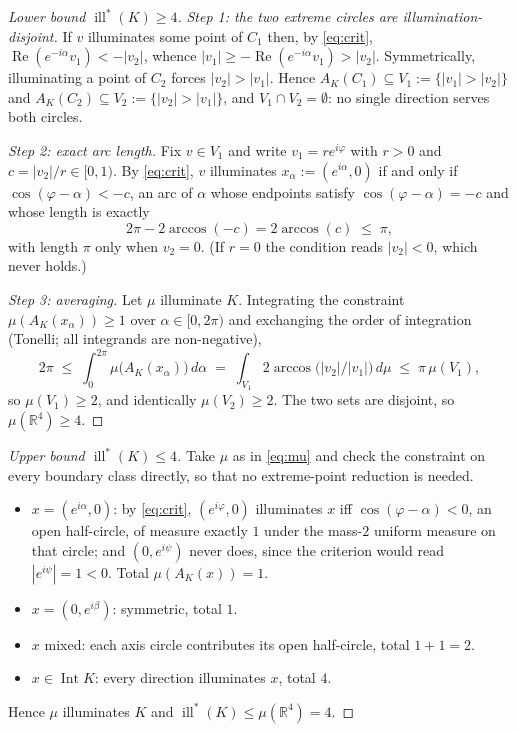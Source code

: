 \documentclass[11pt]{amsart}
\theoremstyle{remark}
\DeclareMathOperator{\ill}{ill}
\DeclareMathOperator{\Int}{Int}
\newcommand{\RR}{\mathbb{R}}
\newcommand{\illstar}{\ill^{*}}
\begin{document}
\begin{proof}[Lower bound $\illstar(K)\ge4$]
\emph{Step 1: the two extreme circles are illumination-disjoint.} If $v$
illuminates some point of $C_{1}$ then, by \eqref{eq:crit},
$\operatorname{Re}(e^{-i\alpha}v_{1})<-|v_{2}|$, whence
$|v_{1}|\ge-\operatorname{Re}(e^{-i\alpha}v_{1})>|v_{2}|$. Symmetrically,
illuminating a point of $C_{2}$ forces $|v_{2}|>|v_{1}|$. Hence
$A_{K}(C_{1})\subseteq V_{1}:=\{|v_{1}|>|v_{2}|\}$ and
$A_{K}(C_{2})\subseteq V_{2}:=\{|v_{2}|>|v_{1}|\}$, and $V_{1}\cap V_{2}
=\emptyset$: no single direction serves both circles.

\emph{Step 2: exact arc length.} Fix $v\in V_{1}$ and write $v_{1}=re^{i\varphi}$
with $r>0$ and $c=|v_{2}|/r\in[0,1)$. By \eqref{eq:crit}, $v$ illuminates
$x_{\alpha}:=(e^{i\alpha},0)$ if and only if $\cos(\varphi-\alpha)<-c$, an arc of
$\alpha$ whose endpoints satisfy $\cos(\varphi-\alpha)=-c$ and whose length is
exactly
\[
  2\pi-2\arccos(-c)=2\arccos(c)\;\le\;\pi ,
\]
with length $\pi$ only when $v_{2}=0$. (If $r=0$ the condition reads
$|v_{2}|<0$, which never holds.)

\emph{Step 3: averaging.} Let $\mu$ illuminate $K$. Integrating the constraint
$\mu(A_{K}(x_{\alpha}))\ge1$ over $\alpha\in[0,2\pi)$ and exchanging the order of
integration (Tonelli; all integrands are non-negative),
\[
  2\pi\;\le\;\int_{0}^{2\pi}\mu\bigl(A_{K}(x_{\alpha})\bigr)\,d\alpha
       \;=\;\int_{V_{1}}2\arccos\!\bigl(|v_{2}|/|v_{1}|\bigr)\,d\mu
       \;\le\;\pi\,\mu(V_{1}),
\]
so $\mu(V_{1})\ge2$, and identically $\mu(V_{2})\ge2$. The two sets are
disjoint, so $\mu(\RR^{4})\ge4$.
\end{proof}

\begin{proof}[Upper bound $\illstar(K)\le4$]
Take $\mu$ as in \eqref{eq:mu} and check the constraint on every boundary class
directly, so that no extreme-point reduction is needed.
\begin{itemize}
\item $x=(e^{i\alpha},0)$: by \eqref{eq:crit}, $(e^{i\varphi},0)$ illuminates $x$
      iff $\cos(\varphi-\alpha)<0$, an open half-circle, of measure exactly $1$
      under the mass-$2$ uniform measure on that circle; and $(0,e^{i\psi})$ never
      does, since the criterion would read $|e^{i\psi}|=1<0$. Total
      $\mu(A_{K}(x))=1$.
\item $x=(0,e^{i\beta})$: symmetric, total $1$.
\item $x$ mixed: each axis circle contributes its open half-circle, total
      $1+1=2$.
\item $x\in\Int K$: every direction illuminates $x$, total $4$.
\end{itemize}
Hence $\mu$ illuminates $K$ and $\illstar(K)\le\mu(\RR^{4})=4$.
\end{proof}
\end{document}
